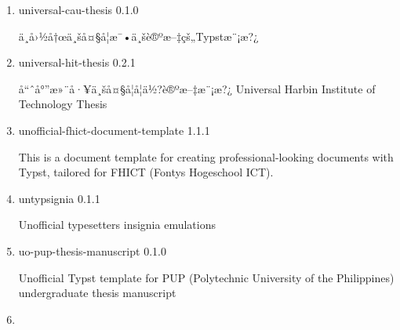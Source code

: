 \begin{enumerate}

  { unilab } { 0.0.2 }

  Lab report
\item
  \href{/universe/package/universal-cau-thesis/}{}


  { universal-cau-thesis } { 0.1.0 }

  ä¸­å›½å†œä¸šå¤§å­¦æ¯•ä¸šè®ºæ--‡çš„Typstæ¨¡æ?¿
\item
  \href{/universe/package/universal-hit-thesis/}{}


  { universal-hit-thesis } { 0.2.1 }

  å``ˆå°''æ»¨å·¥ä¸šå¤§å­¦å­¦ä½?è®ºæ--‡æ¨¡æ?¿ \textbar{} Universal Harbin
  Institute of Technology Thesis
\item
  \href{/universe/package/unofficial-fhict-document-template/}{}


  { unofficial-fhict-document-template } { 1.1.1 }

  This is a document template for creating professional-looking
  documents with Typst, tailored for FHICT (Fontys Hogeschool ICT).
\item
  \href{/universe/package/untypsignia/}{}

  { untypsignia } { 0.1.1 }

  Unofficial typesetter\textquotesingle s insignia emulations
\item
  \href{/universe/package/uo-pup-thesis-manuscript/}{}


  { uo-pup-thesis-manuscript } { 0.1.0 }

  Unofficial Typst template for PUP (Polytechnic University of the
  Philippines) undergraduate thesis manuscript
\item
  \href{/universe/package/upb-corporate-design-slides/}{}


\end{enumerate}

